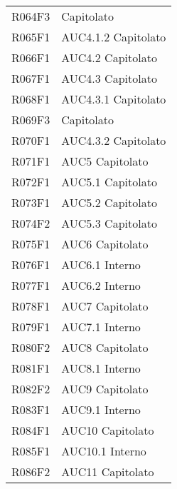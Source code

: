 \documentclass[../analisi-dei-requisiti.tex]{subfiles}
\begin{document}
\begin{longtable}[H]{ p{4cm} | p{4cm} }
  R064F3                               & Capitolato                    \\
  R065F1                               & AUC4.1.2 Capitolato           \\
  R066F1                               & AUC4.2 Capitolato             \\
  R067F1                               & AUC4.3 Capitolato             \\
  R068F1                               & AUC4.3.1 Capitolato           \\
  R069F3                               & Capitolato                    \\
  R070F1                               & AUC4.3.2 Capitolato           \\
  R071F1                               & AUC5 Capitolato               \\
  R072F1                               & AUC5.1 Capitolato             \\
  R073F1                               & AUC5.2 Capitolato             \\
  R074F2                               & AUC5.3 Capitolato             \\
  R075F1                               & AUC6 Capitolato               \\
  R076F1                               & AUC6.1 Interno                \\
  R077F1                               & AUC6.2 Interno                \\
  R078F1                               & AUC7 Capitolato               \\
  R079F1                               & AUC7.1 Interno                \\
  R080F2                               & AUC8 Capitolato               \\
  R081F1                               & AUC8.1 Interno                \\
  R082F2                               & AUC9 Capitolato               \\
  R083F1                               & AUC9.1 Interno                \\
  R084F1                               & AUC10 Capitolato              \\
  R085F1                               & AUC10.1 Interno               \\
  R086F2                               & AUC11 Capitolato              \\

\end{longtable}
\end{document}
